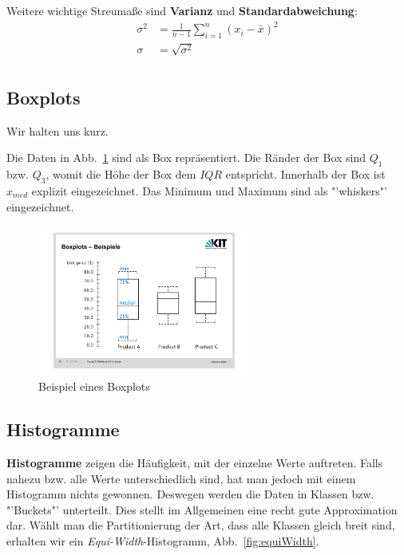 Weitere wichtige Streumaße sind \textbf{Varianz} und \textbf{Standardabweichung}:
\begin{align*}
	\sigma^{2} &= \frac{1}{n-1}\sum\limits_{i=1}^n (x_i -\bar{x})^2 \\
	\sigma &= \sqrt{\sigma^{2}} \\
\end{align*}

\subsection{Boxplots}
Wir halten uns kurz.

\noindent Die Daten in Abb.~\ref{fig:boxplot} sind als Box repräsentiert. Die Ränder der Box sind \(Q_1\) bzw. \(Q_3\), womit die Höhe der Box dem \(IQR\) entspricht. Innerhalb der Box ist \(x_{med}\) explizit eingezeichnet. Das Minimum und Maximum sind als "'whiskers"' eingezeichnet.
\begin{figure}[ht]
	\centering
	\includegraphics[width=0.625\textwidth]{Figures/boxplot}
	\caption[Boxplot Beispiel]{Beispiel eines Boxplots \footnotemark}
	\label{fig:boxplot}
\end{figure}

\subsection{Histogramme}
\textbf{Histogramme} zeigen die Häufigkeit, mit der einzelne Werte auftreten. Falls nahezu bzw. alle Werte unterschiedlich sind, hat man jedoch mit einem Histogramm nichts gewonnen. Deswegen werden die Daten in Klassen bzw. "'Buckets"' unterteilt. Dies stellt im Allgemeinen eine recht gute Approximation dar. Wählt man die Partitionierung der Art, dass alle Klassen gleich breit sind, erhalten wir ein \textit{Equi-Width}-Histogramm, Abb.~\ref{fig:equiWidth}.

